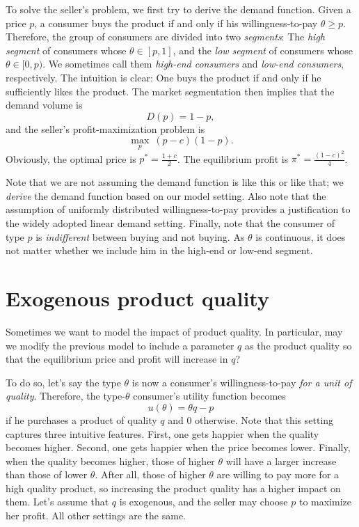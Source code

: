 \documentclass[11pt,a4paper]{article}
\begin{document}
To solve the seller's problem, we first try to derive the demand function. 
Given a price $p$, a consumer buys the product if and only if his willingness-to-pay
$\theta \geq p$. Therefore, the group of consumers are divided into two 
\textit{segments}: The \textit{high segment} of consumers 
whose $\theta \in [p, 1]$, and the \textit{low segment} of consumers
whose $\theta \in [0, p)$. We sometimes call them \textit{high-end consumers}
and \textit{low-end consumers}, respectively. 
The intuition is clear: One buys the product if and 
only if he sufficiently likes the product. 
The market segmentation then implies that the demand volume is 
\[
	D(p) = 1 - p,
\] 
and the seller's profit-maximization problem is
\[
	\max_p \ (p - c)(1 - p). 
\]
Obviously, the optimal price is $p^* = \frac{1 + c}{2}$. 
The equilibrium profit is $\pi^* = \frac{(1 - c)^2}{4}$. 

Note that we are not assuming the demand function is like this or like that; 
we \textit{derive} the demand function based on our model setting. 
Also note that the assumption of uniformly distributed willingness-to-pay
provides a justification to the widely adopted linear demand setting. 
Finally, note that the consumer of type $p$ is \textit{indifferent} between
buying and not buying. As $\theta$ is continuous, it does not matter 
whether we include him in the high-end or low-end segment. 










\section{Exogenous product quality}

Sometimes we want to model the impact of product quality. 
In particular, may we modify the previous model to include a parameter
$q$ as the product quality so that the equilibrium price and profit will
increase in $q$? 

To do so, let's say the type $\theta$ is now a consumer's willingness-to-pay
\textit{for a unit of quality}. Therefore, the type-$\theta$ consumer's 
utility function becomes
\[
	u(\theta) = \theta q - p
\]
if he purchases a product of quality $q$ and 0 otherwise. 
Note that this setting captures 
three intuitive features. First, one gets happier when the quality becomes higher. 
Second, one gets happier when the price becomes lower. 
Finally, when the quality becomes higher, those of higher $\theta$ 
will have a larger increase than those of lower $\theta$. After all, 
those of higher $\theta$ are willing to pay more for a high quality product, 
so increasing the product quality has a higher impact on them. 
Let's assume that $q$ is exogenous, and the seller may choose $p$ to maximize
her profit. All other settings are the same. 
\end{document}
